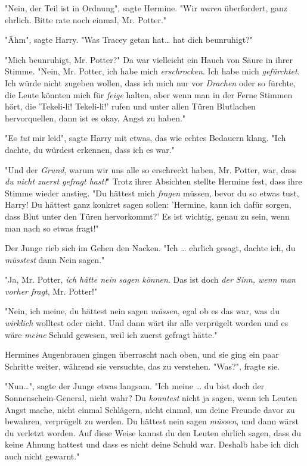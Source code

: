 {"Nein, der Teil ist in Ordnung", sagte Hermine. "Wir \emph{waren} überfordert, ganz ehrlich. Bitte rate noch einmal, Mr. Potter."

"Ähm", sagte Harry. "Was Tracey getan hat… hat dich beunruhigt?"

"Mich beunruhigt, Mr. Potter?" Da war vielleicht ein Hauch von Säure in ihrer Stimme. "Nein, Mr. Potter, ich habe mich \emph{erschrocken}. Ich habe mich \emph{gefürchtet}. Ich würde nicht zugeben wollen, dass ich mich nur vor \emph{Drachen} oder so fürchte, die Leute könnten mich für \emph{feige} halten, aber wenn man in der Ferne Stimmen hört, die 'Tekeli-li! Tekeli-li!' rufen und unter allen Türen Blutlachen hervorquellen, dann ist es okay, Angst zu haben."

"Es \emph{tut} mir leid", sagte Harry mit etwas, das wie echtes Bedauern klang. "Ich dachte, du würdest erkennen, dass ich es war."

"Und der \emph{Grund}, warum wir uns alle so erschreckt haben, Mr. Potter, war, dass \emph{du nicht zuerst gefragt hast!}" Trotz ihrer Absichten stellte Hermine fest, dass ihre Stimme wieder anstieg. "Du hättest mich \emph{fragen} müssen, bevor du so etwas tust, Harry! Du hättest ganz konkret sagen sollen: 'Hermine, kann ich dafür sorgen, dass Blut unter den Türen hervorkommt?' Es ist wichtig, genau zu sein, wenn man nach so etwas fragt!"

Der Junge rieb sich im Gehen den Nacken. "Ich … ehrlich gesagt, dachte ich, du \emph{müsstest} dann Nein sagen."

"Ja, Mr. Potter, \emph{ich hätte nein sagen können}. Das ist doch \emph{der Sinn, wenn man vorher fragt}, Mr. Potter!"

"Nein, ich meine, du hättest nein sagen \emph{müssen}, egal ob es das war, was du \emph{wirklich} wolltest oder nicht. Und dann wärt ihr alle verprügelt worden und es wäre \emph{meine} Schuld gewesen, weil ich zuerst gefragt hätte."

Hermines Augenbrauen gingen überrascht nach oben, und sie ging ein paar Schritte weiter, während sie versuchte, das zu verstehen. "Was?", fragte sie.

"Nun…", sagte der Junge etwas langsam. "Ich meine … du bist doch der Sonnenschein-General, nicht wahr? Du \emph{konntest} nicht ja sagen, wenn ich Leuten Angst mache, nicht einmal Schlägern, nicht einmal, um deine Freunde davor zu bewahren, verprügelt zu werden. Du hättest nein sagen \emph{müssen}, und dann wärst du verletzt worden. Auf diese Weise kannst du den Leuten ehrlich sagen, dass du keine Ahnung hattest und dass es nicht deine Schuld war. Deshalb habe ich dich auch nicht gewarnt."

}
